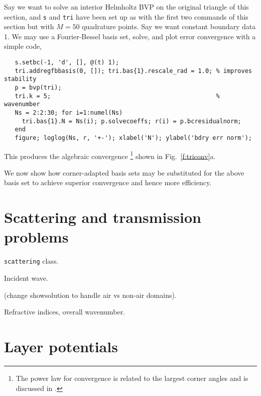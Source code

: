 \documentclass[11pt]{article}
\begin{document}
Say we want to solve an interior Helmholtz BVP on the original triangle
of this section, and {\tt s} and {\tt tri} have been set up as with the
first two commands of this section but with $M=50$ quadrature points.
Say we want constant boundary data 1.
We may use a Fourier-Bessel basis set, solve, and
plot error convergence with a simple code,
\begin{verbatim}
   s.setbc(-1, 'd', [], @(t) 1);
   tri.addregfbbasis(0, []); tri.bas{1}.rescale_rad = 1.0; % improves stability
   p = bvp(tri);
   tri.k = 5;                                              % wavenumber
   Ns = 2:2:30; for i=1:numel(Ns)
     tri.bas{1}.N = Ns(i); p.solvecoeffs; r(i) = p.bcresidualnorm;
   end
   figure; loglog(Ns, r, '+-'); xlabel('N'); ylabel('bdry err norm');
\end{verbatim}
This produces the algebraic convergence%
  \footnote{The power law for convergence is related to the largest corner
angles and is discussed in \cite{Ei74}.}
shown in Fig.~\ref{f:triconv}a.

We now show how corner-adapted basis sets may be substituted for
the above basis set to achieve superior convergence and hence
more efficiency.




\section{Scattering and transmission problems}

{\tt scattering} class.

Incident wave.

(change showsolution to handle air vs non-air domains).

Refractive indices, overall wavenumber.

\section{Layer potentials}




 

\end{document}
